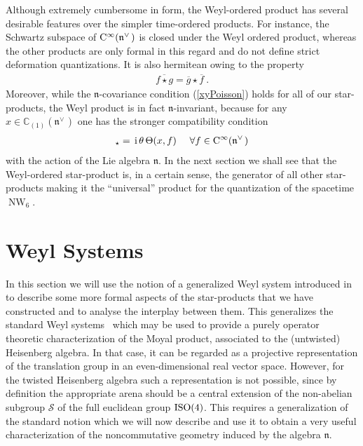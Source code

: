 \documentclass[11pt,a4paper]{article}
\DeclareMathOperator{\NW}{NW}
\newcommand{\1}{\mathbb{1}}
\def\ii{{\,{\rm i}\,}}
\def\CC{{\rm C}}
\def\mfn{{\mathfrak n}}
\newcommand{\newsection}{\setcounter{equation}{0}\section}
\newcommand{\complex}{{\mathbb C}} %
\newcommand{\beq}{\begin{eqnarray}}
\newcommand{\eeq}{\end{eqnarray}}
\begin{document}
Although extremely cumbersome in form, the Weyl-ordered product has
several desirable features over the simpler time-ordered products. For
instance, the Schwartz subspace of $\CC^\infty(\mfn^{\vee\,})$ is closed
under the Weyl ordered product, whereas the other products are only
formal in this regard and do not define strict deformation
quantizations. It is also hermitean owing to the property
\beq
\overline{f\star g}=\overline{g}\star\overline{f} \ .
\label{Weylstarherm}\eeq
Moreover, while the $\mfn$-covariance condition (\ref{xyPoisson})
holds for all of our star-products, the Weyl product is in fact
$\mfn$-invariant, because for any $x\in\complex_{(1)}(\mfn^{\vee\,})$ one
has the stronger compatibility condition
\beq
[x,f]_\star=\ii\theta\,\Theta(x,f) ~~~~ \forall f\in\CC^\infty(\mfn^{\vee\,})
\label{strongcompcond}\eeq
with the action of the Lie algebra $\mfn$. In the next
section we shall see that the Weyl-ordered star-product is, in a
certain sense, the generator of all other star-products making it the
``universal'' product for the quantization of the spacetime $\NW_6$.

\newsection{Weyl Systems\label{WeylSystems}}

In this section we will use the notion of a generalized Weyl system
introduced in~\cite{ALZ1} to describe some more formal aspects of the
star-products that we have constructed and to analyse the interplay
between them. This generalizes the standard Weyl systems~\cite{Sz1}
which may be used to provide a purely operator theoretic
characterization of the Moyal product, associated to the (untwisted)
Heisenberg algebra. In that case, it can be regarded as a projective
representation of the translation group in an even-dimensional real
vector space. However, for the twisted Heisenberg algebra such a
representation is not possible, since by definition the appropriate
arena should be a central extension of the non-abelian subgroup
$\mathcal S$ of the full euclidean group ${\rm ISO}(4)$. This requires a
generalization of the standard notion which we will now describe and
use it to obtain a very useful characterization of the noncommutative
geometry induced by the algebra $\mfn$.
\end{document}
